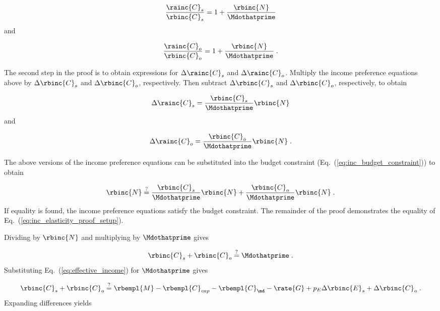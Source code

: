 \begin{equation}
    \frac{\rainc{C}_s}{\rbinc{C}_s} = 1 + \frac{\rbinc{N}}{\Mdothatprime}
\end{equation}
%
and

\begin{equation}
  \frac{\rainc{C}_o}{\rbinc{C}_o} = 1 + \frac{\rbinc{N}}{\Mdothatprime} \; .
\end{equation}
%

The second step in the proof is to obtain expressions 
for $\Delta \rainc{C}_s$ and $\Delta \rainc{C}_o$.
Multiply the income preference equations above
by $\Delta \rbinc{C}_s$ and $\Delta \rbinc{C}_o$, respectively.
Then subtract $\Delta \rbinc{C}_s$ and $\Delta \rbinc{C}_o$, respectively, 
to obtain

\begin{equation}
  \Delta \rainc{C}_s = \frac{\rbinc{C}_s}{\Mdothatprime} \rbinc{N}
\end{equation}
%
and

\begin{equation}
  \Delta \rainc{C}_o = \frac{\rbinc{C}_o}{\Mdothatprime} \rbinc{N} \; .
\end{equation}

The above versions of the income preference equations 
can be substituted into the budget constraint
(Eq.~(\ref{eq:inc_budget_constraint})) to obtain

\begin{equation} \label{eq:inc_elasticity_proof_setup}
  \rbinc{N} \stackrel{?}{=} \frac{\rbinc{C}_s}{\Mdothatprime} \rbinc{N} 
                            + \frac{\rbinc{C}_o}{\Mdothatprime}  \rbinc{N} \; .
\end{equation}
%
If equality is found, 
the income preference equations satisfy the budget constraint.
The remainder of the proof demonstrates the equality
of Eq.~(\ref{eq:inc_elasticity_proof_setup}).

Dividing by $\rbinc{N}$ and multiplying by $\Mdothatprime$ gives

\begin{equation}
  \rbinc{C}_s + \rbinc{C}_o \stackrel{?}{=} \Mdothatprime \; .
\end{equation}
%
Substituting Eq.~(\ref{eq:effective_income}) for $\Mdothatprime$ gives

\begin{equation}
  \rbinc{C}_s + \rbinc{C}_o \stackrel{?}{=} \rbempl{M} - \rbempl{C}_{cap} - \rbempl{C}_{\md} 
                       - \rate{G} + p_E \Delta \rbinc{E}_s + \Delta \rbinc{C}_o \; .
\end{equation}
%
Expanding differences yields

